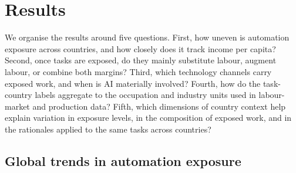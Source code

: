 \documentclass[11pt]{article}
\begin{document}


\section{Results}
\label{sec:results}
\noindent We organise the results around five questions. First, how uneven is automation exposure across countries, and how closely does it track income per capita? Second, once tasks are exposed, do they mainly substitute labour, augment labour, or combine both margins? Third, which technology channels carry exposed work, and when is AI materially involved? Fourth, how do the task-country labels aggregate to the occupation and industry units used in labour-market and production data? Fifth, which dimensions of country context help explain variation in exposure levels, in the composition of exposed work, and in the rationales applied to the same tasks across countries?

\FloatBarrier
\subsection{Global trends in automation exposure}
\label{sec:results_global_trends}
\end{document}
